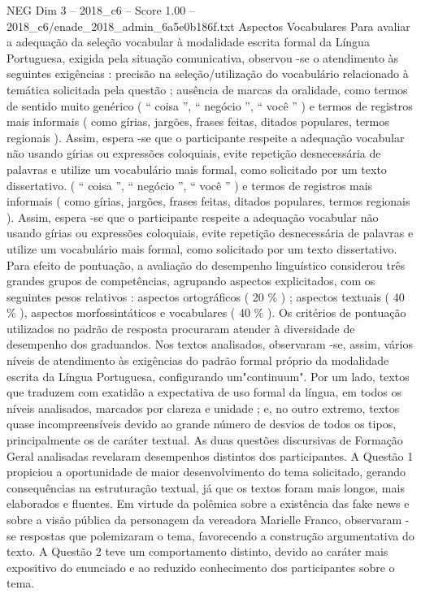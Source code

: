 \begin{textsample}{NEG Dim 3 – 2018\_c6 – Score 1.00 – 2018\_c6/enade\_2018\_admin\_6a5e0b186f.txt}
Aspectos Vocabulares Para avaliar a adequação da seleção vocabular à modalidade escrita formal da Língua Portuguesa, exigida pela situação comunicativa, observou -se o atendimento às seguintes exigências : precisão na seleção/utilização do vocabulário relacionado à temática solicitada pela questão ; ausência de marcas da oralidade, como termos de sentido muito genérico ( “ coisa ”, “ negócio ”, “ você ” ) e termos de registros mais informais ( como gírias, jargões, frases feitas, ditados populares, termos regionais ).
Assim, espera -se que o participante respeite a adequação vocabular não usando gírias ou expressões coloquiais, evite repetição desnecessária de palavras e utilize um vocabulário mais formal, como solicitado por um texto dissertativo. ( “ coisa ”, “ negócio ”, “ você ” ) e termos de registros mais informais ( como gírias, jargões, frases feitas, ditados populares, termos regionais ).
Assim, espera -se que o participante respeite a adequação vocabular não usando gírias ou expressões coloquiais, evite repetição desnecessária de palavras e utilize um vocabulário mais formal, como solicitado por um texto dissertativo.
Para efeito de pontuação, a avaliação do desempenho linguístico considerou três grandes grupos de competências, agrupando aspectos explicitados, com os seguintes pesos relativos : aspectos ortográficos ( 20 \% ) ; aspectos textuais ( 40 \% ), aspectos morfossintáticos e vocabulares ( 40 \% ).
Os critérios de pontuação utilizados no padrão de resposta procuraram atender à diversidade de desempenho dos graduandos.
Nos textos analisados, observaram -se, assim, vários níveis de atendimento às exigências do padrão formal próprio da modalidade escrita da Língua Portuguesa, configurando um"continuum".
Por um lado, textos que traduzem com exatidão a expectativa de uso formal da língua, em todos os níveis analisados, marcados por clareza e unidade ; e, no outro extremo, textos quase incompreensíveis devido ao grande número de desvios de todos os tipos, principalmente os de caráter textual.
As duas questões discursivas de Formação Geral analisadas revelaram desempenhos distintos dos participantes.
A Questão 1 propiciou a oportunidade de maior desenvolvimento do tema solicitado, gerando consequências na estruturação textual, já que os textos foram mais longos, mais elaborados e fluentes.
Em virtude da polêmica sobre a existência das fake news e sobre a visão pública da personagem da vereadora Marielle Franco, observaram -se respostas que polemizaram o tema, favorecendo a construção argumentativa do texto.
A Questão 2 teve um comportamento distinto, devido ao caráter mais expositivo do enunciado e ao reduzido conhecimento dos participantes sobre o tema.

\end{textsample}

